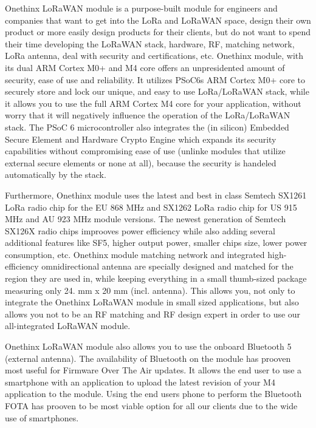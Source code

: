 Onethinx Lo\+Ra\+WAN module is a purpose-\/built module for engineers and companies that want to get into the Lo\+Ra and Lo\+Ra\+WAN space, design their own product or more easily design products for their clients, but do not want to spend their time developing the Lo\+Ra\+WAN stack, hardware, RF, matching network, Lo\+Ra antenna, deal with security and certifications, etc. Onethinx module, with its dual ARM Cortex M0+ and M4 core offers an unpresidented amount of security, ease of use and reliability. It utilizes PSo\+C6s\textquotesingle{} ARM Cortex M0+ core to securely store and lock our unique, and easy to use Lo\+Ra/\+Lo\+Ra\+WAN stack, while it allows you to use the full ARM Cortex M4 core for your application, without worry that it will negatively influence the operation of the Lo\+Ra/\+Lo\+Ra\+WAN stack. The PSoC 6 microcontroller also integrates the (in silicon) Embedded Secure Element and Hardware Crypto Engine which expands its security capabilities without compromising ease of use (unlinke modules that utilize external secure elements or none at all), because the security is handeled automatically by the stack.

Furthermore, Onethinx module uses the latest and best in class Semtech SX1261 Lo\+Ra radio chip for the EU 868 MHz and SX1262 Lo\+Ra radio chip for US 915 MHz and AU 923 MHz module versions. The newest generation of Semtech SX126X radio chips improoves power efficiency while also adding several additional features like SF5, higher output power, smaller chips size, lower power consumption, etc. Onethinx module matching network and integrated high-\/efficiency omnidirectional antenna are specially designed and matched for the region they are used in, while keeping everything in a small thumb-\/sized package measuring only 24. mm x 20 mm (incl. antenna). This allows you, not only to integrate the Onethinx Lo\+Ra\+WAN module in small sized applications, but also allows you not to be an RF matching and RF design expert in order to use our all-\/integrated Lo\+Ra\+WAN module.

Onethinx Lo\+Ra\+WAN module also allows you to use the onboard Bluetooth 5 (external antenna). The availability of Bluetooth on the module has prooven most useful for Firmware Over The Air updates. It allows the end user to use a smartphone with an application to upload the latest revision of your M4 application to the module. Using the end users phone to perform the Bluetooth FOTA has prooven to be most viable option for all our clients due to the wide use of smartphones.

